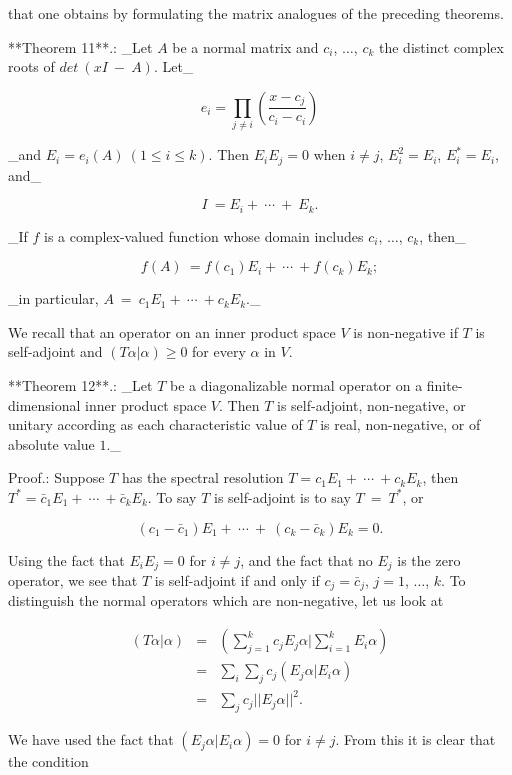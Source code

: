 that one obtains by formulating the matrix analogues of the preceding theorems.

**Theorem 11**.: _Let \(A\) be a normal matrix and \(c_{i}\), \(\ldots\), \(c_{k}\) the distinct complex roots of \(det\ (xI\ -\ A)\). Let_

\[e_{i}=\prod\limits_{j\neq i}\left(\frac{x-c_{j}}{c_{i}-c_{i}}\right)\]

_and \(E_{i}=e_{i}(A)\ (1\leq i\leq k)\). Then \(E_{i}E_{j}=0\) when \(i\neq j\), \(E_{i}^{2}=E_{i}\), \(E_{i}^{*}=E_{i}\), and_

\[I\ =E_{i}+\ \cdots\ +\ E_{k}.\]

_If \(f\) is a complex-valued function whose domain includes \(c_{i}\), \(\ldots\), \(c_{k}\), then_

\[f(A)\ =f(c_{1})E_{i}+\ \cdots\ +f(c_{k})E_{k};\]

_in particular, \(A\ =\ c_{1}E_{1}+\ \cdots\ +c_{k}E_{k}\)._

We recall that an operator on an inner product space \(V\) is non-negative if \(T\) is self-adjoint and \((T\alpha|\alpha)\geq 0\) for every \(\alpha\) in \(V\).

**Theorem 12**.: _Let \(T\) be a diagonalizable normal operator on a finite-dimensional inner product space \(V\). Then \(T\) is self-adjoint, non-negative, or unitary according as each characteristic value of \(T\) is real, non-negative, or of absolute value \(1\)._

Proof.: Suppose \(T\) has the spectral resolution \(T=c_{1}E_{1}+\ \cdots\ +c_{k}E_{k}\), then \(T^{*}=\bar{c}_{1}E_{1}+\ \cdots\ +\bar{c}_{k}E_{k}\). To say \(T\) is self-adjoint is to say \(T\ =\ T^{*}\), or

\[(c_{1}-\bar{c}_{1})E_{1}+\ \cdots\ +\ (c_{k}-\bar{c}_{k})E_{k}=0.\]

Using the fact that \(E_{i}E_{j}=0\) for \(i\neq j\), and the fact that no \(E_{j}\) is the zero operator, we see that \(T\) is self-adjoint if and only if \(c_{j}=\bar{c}_{j}\), \(j=1\), \(\ldots\), \(k\). To distinguish the normal operators which are non-negative, let us look at

\[\begin{array}{rcl}(T\alpha|\alpha)&=&\left(\sum\limits_{j=1}^{k}c_{j}E_{j} \alpha|\sum\limits_{i=1}^{k}E_{i}\alpha\right)\\ &=&\sum\limits_{i}\sum\limits_{j}c_{j}(E_{j}\alpha|E_{i}\alpha)\\ &=&\sum\limits_{j}c_{j}||E_{j}\alpha||^{2}.\end{array}\]

We have used the fact that \((E_{j}\alpha|E_{i}\alpha)=0\) for \(i\neq j\). From this it is clear that the condition 